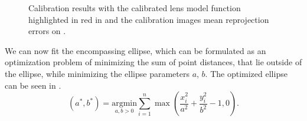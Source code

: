 \begin{figure}[H]
	\centering
	\caption{
		Calibration results with the calibrated lens model function highlighted in red in  and the calibration images mean reprojection errors on .
  }
	\label{fig:calib_r}
\end{figure}

We can now fit the encompassing ellipse, which can be formulated as an optimization problem  of minimizing the sum of point distances, that lie outside of the
ellipse, while minimizing the ellipse parameters $a$, $b$.
The optimized ellipse can be seen in .
\begin{equation}
    (a^*, b^*) = \underset{a, b > 0}{\text{argmin}} \sum_{i=1}^n \max\left( \frac{x_i^2}{a^2} + \frac{y_i^2}{b^2} - 1, 0 \right).
    \label{eq:ellipse_opt}
\end{equation}

